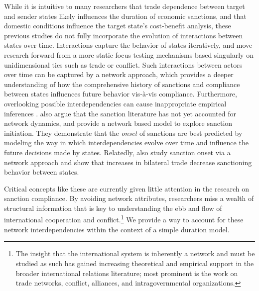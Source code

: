 While it is intuitive to many researchers that trade dependence between target and sender states likely influences the duration of economic sanctions, and that domestic conditions influence the target state's cost-benefit analysis, these previous studies do not fully incorporate the evolution of interactions between states over time. Interactions capture the  behavior of states iteratively, and move research forward from a more static focus testing mechanisms based singularly on unidimensional ties such as trade or conflict. Such interactions between actors over time can be captured by a network approach, which provides a deeper understanding of how the comprehensive history of sanctions and compliance between states influences future behavior vis-\`a-vis compliance. Furthermore, overlooking possible interdependencies can cause inappropriate empirical inferences \citep{erikson2014dyadic}. \citet{cranmer2014reciprocity} also argue that the sanction literature has not yet accounted for network dynamics, and provide a network based model to explore sanction initiation. They demonstrate that the \textit{onset} of sanctions are best predicted by modeling the way in which interdependencies evolve over time and influence the future decisions made by states. Relatedly, \citet{hafner2008} also study sanction onset via a network approach and show that increases in bilateral trade decrease sanctioning behavior between states.

Critical concepts like these are currently given little attention in the research on sanction compliance. By avoiding network attributes, researchers miss a wealth of structural information that is key to understanding the ebb and flow of international cooperation and conflict.\footnote{The insight that the international system is inherently a network and must be studied as such has gained increasing theoretical and empirical support in the broader international relations literature; most prominent is the work on trade networks,\cite{hoff2004modeling, ward:rainbow:2013} conflict,\cite{ward2007disputes} alliances, \cite{warren2010geometry} and intragovernmental organizations.\cite{cao2009networks,greenhill2010norm}} We provide a way to account for these network interdependencies within the context of a simple duration model.

